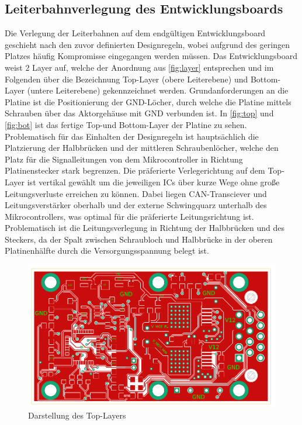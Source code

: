\subsection{Leiterbahnverlegung des Entwicklungsboards}
Die Verlegung der Leiterbahnen auf dem endgültigen Entwicklungsboard geschieht nach den zuvor definierten Designregeln, wobei aufgrund des geringen Platzes häufig Kompromisse eingegangen werden müssen. Das Entwicklungsboard weist 2 Layer auf, welche der Anordnung aus \autoref{fig:layer} entsprechen und im Folgenden über die Bezeichnung Top-Layer (obere Leiterebene) und Bottom-Layer (untere Leiterebene) gekennzeichnet werden. Grundanforderungen an die Platine ist die Positionierung der GND-Löcher, durch welche die Platine mittels Schrauben über das Aktorgehäuse mit GND verbunden ist. In \autoref{fig:top} und \autoref{fig:bot} ist das fertige Top-und Bottom-Layer der Platine zu sehen. Problematisch für das Einhalten der Designregeln ist hauptsächlich die Platzierung der Halbbrücken und der mittleren Schraubenlöcher, welche den Platz für die Signalleitungen von dem Mikrocontroller in Richtung Platinenstecker stark begrenzen. Die präferierte Verlegerichtung auf dem Top-Layer ist vertikal gewählt um die jeweiligen ICs über kurze Wege ohne große Leitungsverluste erreichen zu können. Dabei liegen CAN-Transciever und Leitungsverstärker oberhalb und der externe Schwingquarz unterhalb des Mikrocontrollers, was optimal für die präferierte Leitungsrichtung ist. Problematisch ist die Leitungsverlegung in Richtung der Halbbrücken und des Steckers, da der Spalt zwischen Schraubloch und Halbbrücke in der oberen Platinenhälfte durch die Versorgungsspannung belegt ist. 
\begin{figure}[H]%
\centering
\includegraphics[width=400pt]{./Bilder/top2}%
\caption{Darstellung des Top-Layers}%
\label{fig:top}%
\end{figure}
